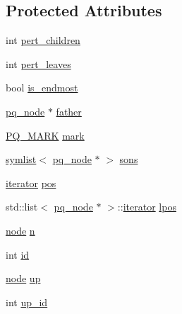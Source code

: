 \subsection*{Protected Attributes}
\begin{DoxyCompactItemize}
\item 
int \mbox{\hyperlink{classpq__node_a8d8fb7b3059e7aeecf62eeed34076afb}{pert\+\_\+children}}
\item 
int \mbox{\hyperlink{classpq__node_a3fb78609f93f41efd6826ed3169fc312}{pert\+\_\+leaves}}
\item 
bool \mbox{\hyperlink{classpq__node_a058dda3d1197dfd2b343d1983d305d79}{is\+\_\+endmost}}
\item 
\mbox{\hyperlink{classpq__node}{pq\+\_\+node}} $\ast$ \mbox{\hyperlink{classpq__node_a3e7c886498c76c633f057fb42ff9c435}{father}}
\item 
\mbox{\hyperlink{classpq__node_a6236b20cd5f6cc02cb5f637ed34c96d9}{P\+Q\+\_\+\+M\+A\+RK}} \mbox{\hyperlink{classpq__node_aee913582a7b268ce2570bee8a8367c50}{mark}}
\item 
\mbox{\hyperlink{classsymlist}{symlist}}$<$ \mbox{\hyperlink{classpq__node}{pq\+\_\+node}} $\ast$ $>$ \mbox{\hyperlink{classpq__node_a2cc030cfa4560872acea8b50ebd0542b}{sons}}
\item 
\mbox{\hyperlink{classpq__node_a34898c9eb1527787c07e8ebefd6bfba5}{iterator}} \mbox{\hyperlink{classpq__node_a5e8a5defa0fec4ff2e82fabee97296b4}{pos}}
\item 
std\+::list$<$ \mbox{\hyperlink{classpq__node}{pq\+\_\+node}} $\ast$ $>$\+::\mbox{\hyperlink{classpq__node_a34898c9eb1527787c07e8ebefd6bfba5}{iterator}} \mbox{\hyperlink{classpq__node_a71cc9bb3c11aac468ff77d64643c38dc}{lpos}}
\item 
\mbox{\hyperlink{classnode}{node}} \mbox{\hyperlink{classpq__node_a4997fd09a95d9a659b99cea04197740a}{n}}
\item 
int \mbox{\hyperlink{classpq__node_ad0034c1f93c3c77edb6d3a03f25aba06}{id}}
\item 
\mbox{\hyperlink{classnode}{node}} \mbox{\hyperlink{classpq__node_ae6d5a236397b9a57159487eac7ec168d}{up}}
\item 
int \mbox{\hyperlink{classpq__node_a5a7bcdde1f57191a77a6a14994b38a50}{up\+\_\+id}}
\end{DoxyCompactItemize}
